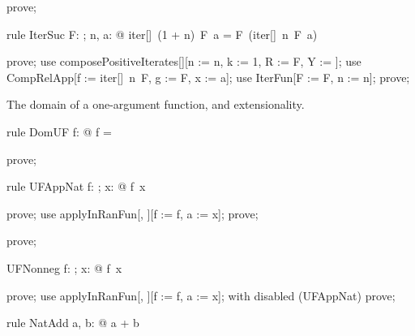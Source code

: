 \documentclass{article}
\begin{document}
\begin{zproof}
prove;
\end{zproof}

\begin{theorem}{rule IterSuc}
  \forall F: \nat \fun \nat; n, a: \nat @ iter[\nat]~(1 + n)~F~a = F~(iter[\nat]~n~F~a)
\end{theorem}

\begin{zproof}
prove;
use composePositiveIterates[\nat][n := n, k := 1, R := F, Y := \nat];
use CompRelApp[f := iter[\nat]~n~F, g := F, x := a];
use IterFun[F := F, n := n];
prove;
\end{zproof}

The domain of a one-argument function, and extensionality.

\begin{theorem}{rule DomUF}
  \forall f: \nat \fun \nat @ \dom f = \nat
\end{theorem}

\begin{zproof}
prove;
\end{zproof}

\begin{theorem}{rule UFAppNat}
  \forall f: \nat \fun \nat; x: \nat @ f~x \in \nat
\end{theorem}

\begin{zproof}
prove;
use applyInRanFun[\nat, \nat][f := f, a := x];
prove;
\end{zproof}


\begin{zproof}
prove;
\end{zproof}

\begin{theorem}{UFNonneg}
  \forall f: \nat \fun \nat; x: \nat @ f~x 
\end{theorem}

\begin{zproof}
prove;
use applyInRanFun[\nat, \nat][f := f, a := x];
with disabled (UFAppNat) prove;
\end{zproof}

\begin{theorem}{rule NatAdd}
  \forall a, b: \nat @ a + b \in \nat
\end{theorem}
\end{document}
